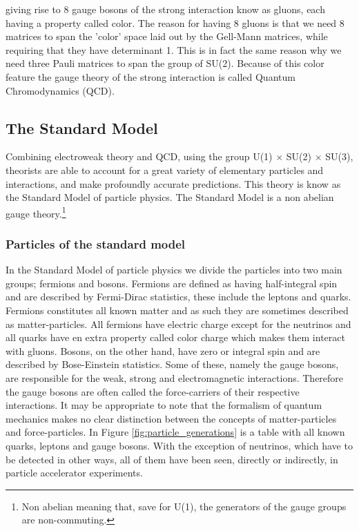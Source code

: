 giving rise to 8 gauge bosons of the strong interaction know as gluons, each having a property called color. The reason for having 8 gluons is that we need 8 matrices to span the 'color' space laid out by the Gell-Mann matrices, while requiring that they have determinant 1. This is in fact the same reason why we need three Pauli matrices to span the group of SU(2). Because of this color feature the gauge theory of the strong interaction is called Quantum Chromodynamics (QCD).

\subsection{The Standard Model}
Combining electroweak theory and QCD, using the group U(1) $\times$ SU(2) $\times$ SU(3), theorists are able to account for a great variety of elementary particles and interactions, and make profoundly accurate predictions. This theory is know as the Standard Model of particle physics. The Standard Model is a non abelian gauge theory.\footnote{Non abelian meaning that, save for U(1), the generators of the gauge groups are non-commuting.}

\subsubsection{Particles of the standard model} \label{sec:particles}


In the Standard Model of particle physics we divide the particles into two main groups; fermions and bosons. Fermions are defined as having half-integral spin and are described by Fermi-Dirac statistics, these include the leptons and quarks. Fermions constitutes all known matter and as such they are sometimes described as matter-particles. All fermions have electric charge except for the neutrinos and all quarks have en extra property called color charge which makes them interact with gluons. Bosons, on the other hand, have zero or integral spin and are described by Bose-Einstein statistics. Some of these, namely the gauge bosons, are responsible for the weak, strong and electromagnetic interactions. Therefore the gauge bosons are often called the force-carriers of their respective interactions. It may be appropriate to note that the formalism of quantum mechanics makes no clear distinction between the concepts of matter-particles and force-particles. In Figure \ref{fig:particle_generations} is a table with all known quarks, leptons and gauge bosons. With the exception of neutrinos, which have to be detected in other ways, all of them have been seen, directly or indirectly, in particle accelerator experiments.

